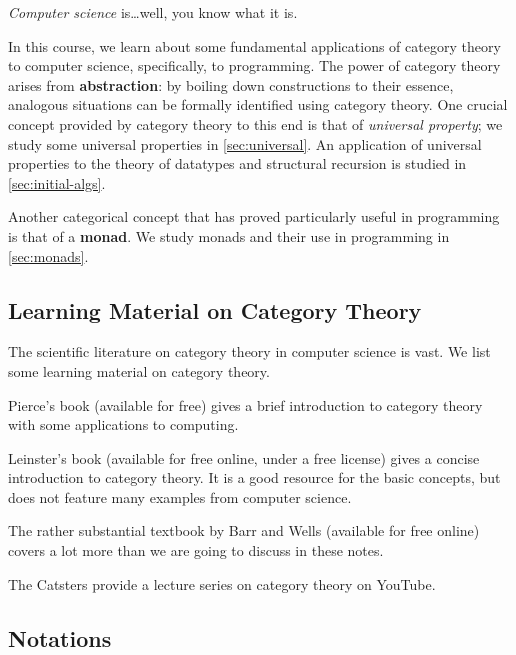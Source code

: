 \documentclass[a4paper,10pt]{scrartcl}
\theoremstyle{plain}
\theoremstyle{definition}
\begin{document}
\emph{Computer science} is\ldots well, you know what it is.

In this course, we learn about some fundamental applications of category theory to computer science, specifically, to programming.
The power of category theory arises from \textbf{abstraction}:
by boiling down constructions to their essence, analogous situations can be formally identified using category theory.
One crucial concept provided by category theory to this end is that of \emph{universal property};
we study some universal properties in \cref{sec:universal}.
An application of universal properties to the theory of datatypes and structural recursion is studied in \cref{sec:initial-algs}.

Another categorical concept that has proved particularly useful in programming is that of a \textbf{monad}.
We study monads and their use in programming in \cref{sec:monads}.




\subsection{Learning Material on Category Theory}
\label{sec:material}

The scientific literature on category theory in computer science is vast.
We list some learning material on category theory.

Pierce's book \cite{pierce} (available for free) gives a brief introduction to category theory with some applications to computing.

Leinster's book \cite{leinster} (available for free online, under a free license) gives a concise introduction to category theory.
It is a good resource for the basic concepts, but does not feature many examples from computer science.

The rather substantial textbook by Barr and Wells \cite{barr-wells} (available for free online) covers a lot more than we are going to discuss in these notes.

The Catsters \cite{catsters} provide a lecture series on category theory on YouTube.



\subsection{Notations}
\label{sec:notation}
\end{document}
